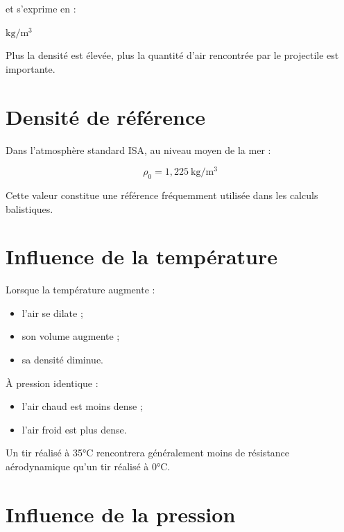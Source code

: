 et s'exprime en :

\begin{center}$\mathrm{kg/m^3}$\end{center}

Plus la densité est élevée, plus la quantité d'air rencontrée par le
projectile est importante.

\section{Densité de référence}

Dans l'atmosphère standard ISA, au niveau moyen de la mer :

\begin{equation}
\rho_0 = 1,225~\mathrm{kg/m^3}
\end{equation}

Cette valeur constitue une référence fréquemment utilisée dans les calculs
balistiques.

\section{Influence de la température}

Lorsque la température augmente :

\begin{itemize}
\item l'air se dilate ;
\item son volume augmente ;
\item sa densité diminue.
\end{itemize}

À pression identique :

\begin{itemize}
\item l'air chaud est moins dense ;
\item l'air froid est plus dense.
\end{itemize}

\begin{exemple}

Un tir réalisé à 35°C rencontrera généralement moins de résistance
aérodynamique qu'un tir réalisé à 0°C.

\end{exemple}

\section{Influence de la pression}

